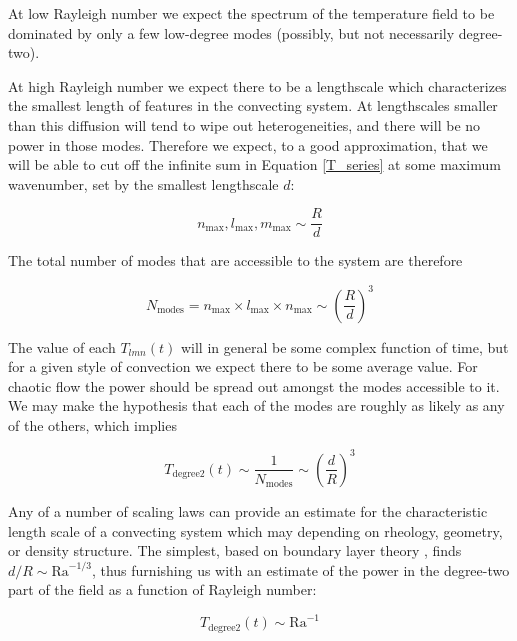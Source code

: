\documentclass[extra,mreferee]{gji}
\begin{document}
At low Rayleigh number we expect the spectrum of the temperature field to be dominated by only a few low-degree modes (possibly, but not necessarily degree-two).

At high Rayleigh number we expect there to be a lengthscale which characterizes the smallest length of features in the convecting system.  
At lengthscales smaller than this diffusion will tend to wipe out heterogeneities, and there will be no power in those modes.  
Therefore we expect, to a good approximation, that we will be able to cut off the infinite sum in Equation \ref{T_series} at some maximum wavenumber, set by the smallest lengthscale $d$:
 
\begin{equation}
n_{\mathrm{max}}, l_{\mathrm{max}}, m_{\mathrm{max}} \sim \frac{R}{d}
\end{equation}

The total number of modes that are accessible to the system are therefore 

\begin{equation}
N_{\mathrm{modes}} = n_{\mathrm{max}} \times l_{\mathrm{max}} \times n_{\mathrm{max}} \sim \left( \frac{R}{d} \right)^{3}
\end{equation}

The value of each $T_{lmn}(t)$ will in general be some complex function of time, but for a given style of convection we expect there to be some average value.
For chaotic flow the power should be spread out amongst the modes accessible to it.
We may make the hypothesis that each of the modes are roughly as likely as any of the others, which implies

\begin{equation}
T_{\mathrm{degree 2}}(t) \sim \frac{1}{N_{\mathrm{modes}}} \sim \left( \frac{d}{R}\right)^3
\end{equation}

Any of a number of scaling laws can provide an estimate for the characteristic length scale of a convecting system which may depending on rheology, geometry, or density structure.
The simplest, based on boundary layer theory \citep{turcotte1967finite}, finds $d/R \sim \mathrm{Ra}^{-1/3}$, thus furnishing us with an estimate of the power in the degree-two part of the field as a function of Rayleigh number:

\begin{equation}
T_{\mathrm{degree 2}}(t) \sim \mathrm{Ra}^{-1}
\end{equation}
\end{document}
